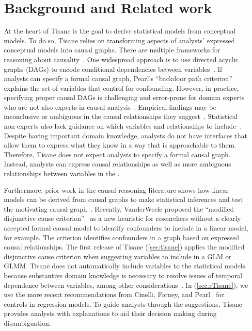 \section{Background and Related work} \label{sec:relatedWorkTisane}
At the heart of Tisane is the goal to derive statistical models from conceptual
models. To do so, Tisane relies on transforming aspects of analysts' expressed
conceptual models into causal graphs. There are multiple frameworks for
reasoning about causality~\cite{rubin2004teaching,pearl1995causal}. One
widespread approach is to use directed acyclic graphs (DAGs) to encode
conditional dependencies between
variables~\cite{pearl1995doCalculus,greenland1999causal,spirtes1994conditional,spirtes1996using}.
If analysts can specify a formal causal graph, Pearl's ``backdoor path
criterion''~\cite{pearl1995causal,pearl2000models} explains the set of variables
that control for confounding. However, in practice, specifying proper causal
DAGs is challenging and error-prone for domain experts who are not also experts
in causal analysis~\cite{suzuki2020causal}. Empirical findings may be
inconclusive or ambiguous in the causal relationships they
suggest~\cite{suzuki2018mechanisms}. Statistical non-experts also lack guidance
on which variables and relationships to include~\cite{velentgas2013developing}.
Despite having important domain knowledge, analysts do not have interfaces that
allow them to express what they know in a way that is approachable to them.
Therefore, Tisane does not expect analysts to specify a formal causal graph.
Instead, analysts can express causal relationships as well as more ambiguous
relationships between variables in the \SDSLlong.

Furthermore, prior work in the causal reasoning literature shows how linear
models can be derived from causal graphs to make statistical inferences and test
the motivating causal graph~\cite{spirtes1996using,spirtes1994conditional}.
Recently, VanderWeele proposed the ``modified disjunctive cause
criterion''~\cite{vanderweele2019modifiedDisjunctiveCriterion} as a new
heuristic for researchers without a clearly accepted formal causal model to
identify confounders to include in a linear model, for example. The criterion
identifies confounders in a graph based on expressed causal relationships. The
first release of Tisane (\autoref{sec:tisane}) applies the modified disjunctive
cause criterion when suggesting variables to include in a GLM or GLMM. Tisane
does not automatically include variables to the statistical models because
substantive domain knowledge is necessary to resolve issues of temporal
dependence between variables, among other
considerations~\cite{vanderweele2019modifiedDisjunctiveCriterion}. In \rTisane (\autoref{sec:rTisane}), we use the more recent
recommendations from Cinelli, Forney, and Pearl~\cite{cinelli2020controls} for
controls in regression models. To guide analysts through the suggestions, Tisane
provides analysts with explanations to aid their decision making during
disambiguation. 


